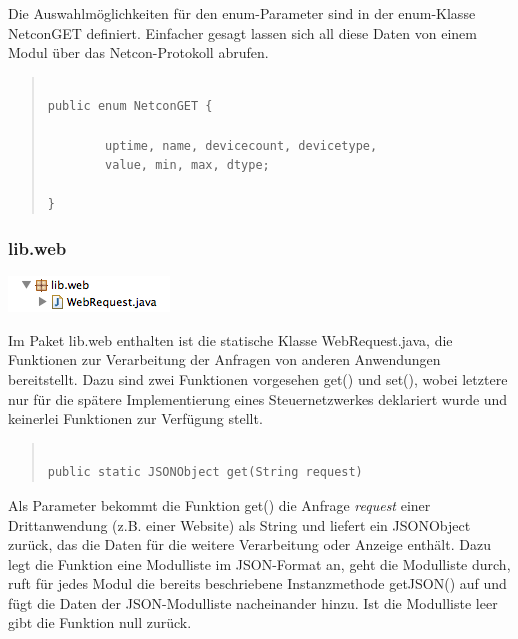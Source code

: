\documentclass[a4paper,14pt,headsepline]{scrartcl}
\begin{document}
Die Auswahlmöglichkeiten für den enum-Parameter sind in der enum-Klasse NetconGET definiert. Einfacher gesagt lassen sich all diese Daten von einem Modul über das Netcon-Protokoll abrufen.  


\begin{quote}
\begin{verbatim}

public enum NetconGET {

	    uptime, name, devicecount, devicetype, 
	    value, min, max, dtype;

}

\end{verbatim}
\end{quote}

\newpage

\subsubsection*{lib.web}

\includegraphics[width=0.2 \paperwidth]{./bilder/lib_web.png}

Im Paket lib.web enthalten ist die statische Klasse WebRequest.java, die Funktionen zur Verarbeitung der Anfragen von anderen Anwendungen bereitstellt. Dazu sind zwei Funktionen vorgesehen get() und set(), wobei letztere nur für die spätere Implementierung eines Steuernetzwerkes deklariert wurde und keinerlei Funktionen zur Verfügung stellt. 

\begin{quote}
\begin{verbatim}

public static JSONObject get(String request)

\end{verbatim}
\end{quote} 

Als Parameter bekommt die Funktion get() die Anfrage \textit{request} einer Drittanwendung (z.B. einer Website) als String und liefert ein JSONObject zurück, das die Daten für die weitere Verarbeitung oder Anzeige enthält. Dazu legt die Funktion eine Modulliste im JSON-Format an, geht die Modulliste durch, ruft für jedes Modul die bereits beschriebene Instanzmethode getJSON() auf und fügt die Daten der JSON-Modulliste nacheinander hinzu. Ist die Modulliste leer gibt die Funktion null zurück. 
\end{document}
